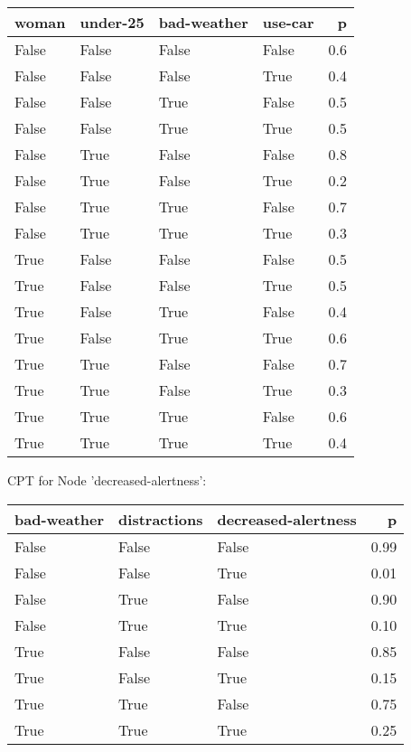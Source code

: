 \begin{tabular}{llllr}
\toprule
 woman &  under-25 &  bad-weather &  use-car &   p \\
\midrule
 False &     False &        False &    False & 0.6 \\
 False &     False &        False &     True & 0.4 \\
 False &     False &         True &    False & 0.5 \\
 False &     False &         True &     True & 0.5 \\
 False &      True &        False &    False & 0.8 \\
 False &      True &        False &     True & 0.2 \\
 False &      True &         True &    False & 0.7 \\
 False &      True &         True &     True & 0.3 \\
  True &     False &        False &    False & 0.5 \\
  True &     False &        False &     True & 0.5 \\
  True &     False &         True &    False & 0.4 \\
  True &     False &         True &     True & 0.6 \\
  True &      True &        False &    False & 0.7 \\
  True &      True &        False &     True & 0.3 \\
  True &      True &         True &    False & 0.6 \\
  True &      True &         True &     True & 0.4 \\
\bottomrule
\end{tabular}


CPT for Node 'decreased-alertness':

\begin{tabular}{lllr}
\toprule
 bad-weather &  distractions &  decreased-alertness &    p \\
\midrule
       False &         False &                False & 0.99 \\
       False &         False &                 True & 0.01 \\
       False &          True &                False & 0.90 \\
       False &          True &                 True & 0.10 \\
        True &         False &                False & 0.85 \\
        True &         False &                 True & 0.15 \\
        True &          True &                False & 0.75 \\
        True &          True &                 True & 0.25 \\
\bottomrule
\end{tabular}

